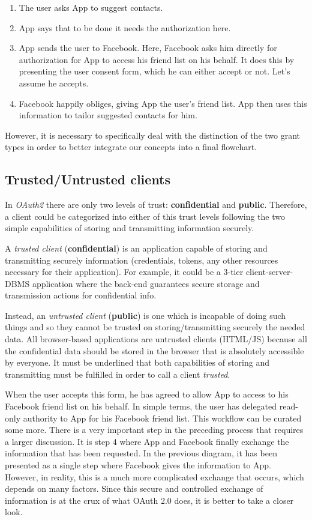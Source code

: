 \begin{enumerate}
    \item The user asks App to suggest contacts.
    \item App says that to be done it needs the authorization here.
    \item App sends the user to Facebook. Here, Facebook asks him directly for authorization for App to access his friend list on his behalf. It does this by presenting the user consent form, which he can either accept or not. Let's assume he accepts.
    \item Facebook happily obliges, giving App the user's friend list. App then uses this information to tailor suggested contacts for him.
\end{enumerate}

However, it is necessary to specifically deal with the distinction of the two grant types in order to better integrate our concepts into a final flowchart.

\subsection{Trusted/Untrusted clients}

In \textit{OAuth2} there are only two levels of trust: \textbf{confidential} and \textbf{public}. 
Therefore, a client could be categorized into either of this trust levels following the two simple capabilities of storing and transmitting information securely.

A \textit{trusted client} (\textbf{confidential}) is an application capable of storing and transmitting securely information (credentials, tokens, any other resources necessary for their application).
For example, it could be a 3-tier client-server-DBMS application where the back-end guarantees secure storage and transmission actions for confidential info. 

Instead, an \textit{untrusted client} (\textbf{public}) is one which is incapable of doing such things and so they cannot be trusted on storing/transmitting securely the needed data. All browser-based applications are untrusted clients (HTML/JS) because all the confidential data should be stored in the browser that is absolutely accessible by everyone.
It must be underlined that both capabilities of storing and transmitting must be fulfilled in order to call a client \textit{trusted}.

When the user accepts this form, he has agreed to allow App to access to his Facebook friend list on his behalf. In simple terms, the user has delegated read-only authority to App for his Facebook friend list.
This workflow can be curated some more. There is a very important step in the
preceding process that requires a larger discussion. It is step 4 where App and
Facebook finally exchange the information that has been requested. In the previous diagram, it has been presented as a single step where Facebook gives the information to App. However, in reality, this is a much more complicated exchange that occurs, which depends on many factors. Since this secure and controlled exchange of information is at the crux of what OAuth 2.0 does, it is better to take a closer look.


